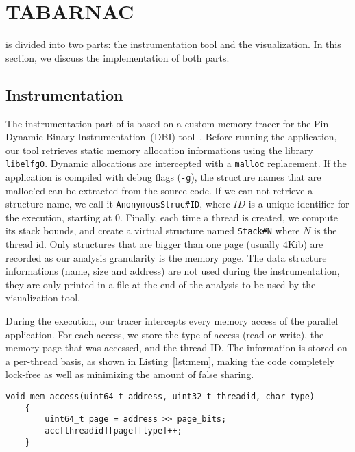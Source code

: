 
\section{TABARNAC}
\label{sec:design}

\TABARNAC is divided into two parts: the instrumentation tool and the
visualization.  In this section, we discuss the implementation of both parts.

\subsection{Instrumentation}
\label{sec:design-impl}

The instrumentation part of \TABARNAC is based on a custom memory tracer for the Pin Dynamic Binary Instrumentation~(DBI) tool~\cite{Luk05Pin}.
Before running the application, our tool retrieves static memory allocation
informations using the library \texttt{libelfg0}. Dynamic allocations are
intercepted with a \texttt{malloc} replacement. If the application is
compiled with debug flags (\texttt{-g}), the structure names that are malloc'ed can be extracted from the source
code. If we can not retrieve a structure name, we call it
\texttt{AnonymousStruc\#ID}, where $ID$ is a unique identifier for the
execution, starting at $0$. Finally, each time a thread is created, we compute
its stack bounds, and create a virtual structure named \texttt{Stack\#N} where
$N$ is the thread id. Only structures that are bigger than one page (usually
$4$Kib) are recorded as our
analysis granularity is the memory page. The data structure informations (name,
size and address) are not used during the instrumentation, they are only
printed in a file at the end of the analysis to be used by the visualization
tool.

During the execution, our tracer intercepts every memory access of the parallel application.
For each access, we store the type of access (read or write), the memory page that was accessed, and the thread ID.
The information is stored on a per-thread basis, as shown in
Listing~\ref{lst:mem}, making the code completely lock-free as well as minimizing the amount of false sharing.

\begin{lstlisting}[caption=Code that is executed on each memory access.,label=lst:mem]
	void mem_access(uint64_t address, uint32_t threadid, char type)
	{
		uint64_t page = address >> page_bits;
		acc[threadid][page][type]++;
	}

\end{lstlisting}


